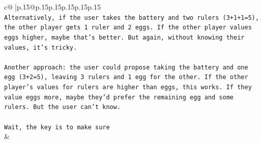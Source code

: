 \documentclass{article}
\begin{document}
{\begin{supertabular}{c@{$\;$}|p{.15\linewidth}@{}p{.15\linewidth}p{.15\linewidth}p{.15\linewidth}p{.15\linewidth}p{.15\linewidth}}
{{{\\ 
\texttt{Alternatively, if the user takes the battery and two rulers (3+1+1=5), the other player gets 1 ruler and 2 eggs. If the other player values eggs higher, maybe that's better. But again, without knowing their values, it's tricky.} \\
\\ 
\texttt{Another approach: the user could propose taking the battery and one egg (3+2=5), leaving 3 rulers and 1 egg for the other. If the other player's values for rulers are higher than eggs, this works. If they value eggs more, maybe they'd prefer the remaining egg and some rulers. But the user can't know.} \\
\\ 
\texttt{Wait, the key is to make sure} \\
            }
        }
    }
    & \\ \\


\end{supertabular}}
\end{document}
